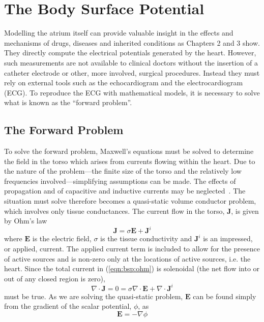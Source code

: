 \chapter{The Body Surface Potential}


Modelling the atrium itself can provide valuable insight in the effects and
mechanisms of drugs, diseases and inherited conditions as Chapters 2 and 3 show.
They directly compute the electrical potentials generated by the heart.
However, such measurements are not available to clinical doctors without the
insertion of a catheter electrode or other, more involved, surgical procedures.
Instead they must rely on external tools such as the echocardiogram and the
electrocardiogram (ECG).
To reproduce the ECG with mathematical models, it is necessary to solve what is known as
the ``forward problem''.

\section{The Forward Problem}

To solve the forward problem, Maxwell's equations must be solved to determine the
field in the torso which arises from currents flowing within the heart.
Due to the nature of the problem---the finite size of the torso and the
relatively low frequencies involved---simplifying assumptions can be made.
The effects of propagation and of capacitive and inductive currents may be
neglected~\cite{Barnard1966}.
The situation must solve therefore becomes a quasi-static volume conductor
problem, which involves only tissue conductances.
The current flow in the torso, $\mathbf{J}$, is given by Ohm's law
\begin{equation}
\label{eqn:bsp:ohm}
\mathbf{J} = \sigma\mathbf{E} + \mathbf{J}^{i}
\end{equation}
where $\mathbf{E}$ is the electric field, $\sigma$ is the tissue conductivity
and $\mathbf{J}^{i}$ is an impressed, or applied, current.
The applied current term is included to allow for the presence of active sources and
is non-zero only at the locations of active sources, i.e. the heart.
Since the total current in (\ref{eqn:bsp:ohm}) is solenoidal (the net flow into or
out of any closed region is zero),
\begin{equation}
\label{eqn:bsp:ohm2}
\nabla \cdot \mathbf{J} = 0 = \sigma \nabla \cdot \mathbf{E} + \nabla \cdot \mathbf{J}^{i}
\end{equation}
must be true.
As we are solving the quasi-static problem, $\mathbf{E}$ can be
found simply from the gradient of the scalar potential, $\phi$, as
\begin{equation}
\label{eqn:bsp:maxwell}
\mathbf{E} = - \nabla\phi
\end{equation}

